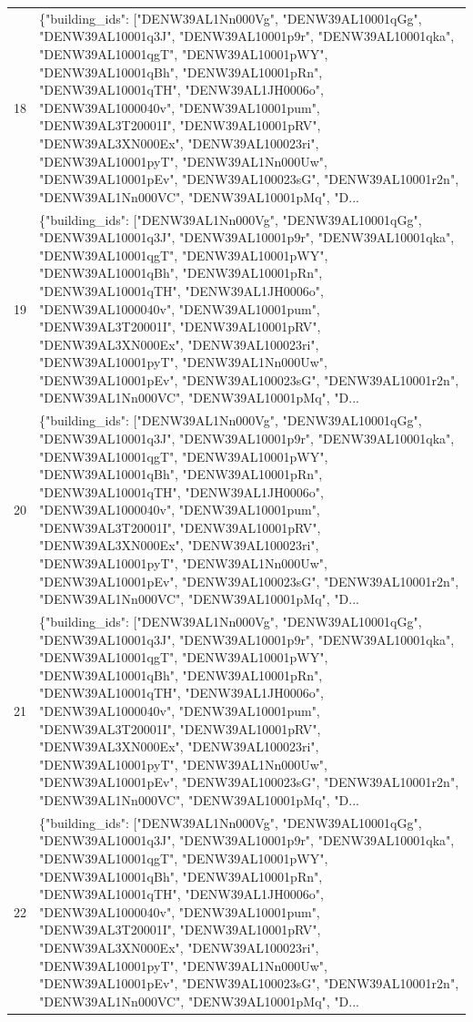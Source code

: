 \documentclass[a4paper,11pt]{article}
\begin{document}
\begin{table}[ht]
\begin{tabular}{r p{12cm}}
18 & \{"building\_ids": ["DENW39AL1Nn000Vg", "DENW39AL10001qGg", "DENW39AL10001q3J", "DENW39AL10001p9r", "DENW39AL10001qka", "DENW39AL10001qgT", "DENW39AL10001pWY", "DENW39AL10001qBh", "DENW39AL10001pRn", "DENW39AL10001qTH", "DENW39AL1JH0006o", "DENW39AL1000040v", "DENW39AL10001pum", "DENW39AL3T20001I", "DENW39AL10001pRV", "DENW39AL3XN000Ex", "DENW39AL100023ri", "DENW39AL10001pyT", "DENW39AL1Nn000Uw", "DENW39AL10001pEv", "DENW39AL100023sG", "DENW39AL10001r2n", "DENW39AL1Nn000VC", "DENW39AL10001pMq", "D... \\
19 & \{"building\_ids": ["DENW39AL1Nn000Vg", "DENW39AL10001qGg", "DENW39AL10001q3J", "DENW39AL10001p9r", "DENW39AL10001qka", "DENW39AL10001qgT", "DENW39AL10001pWY", "DENW39AL10001qBh", "DENW39AL10001pRn", "DENW39AL10001qTH", "DENW39AL1JH0006o", "DENW39AL1000040v", "DENW39AL10001pum", "DENW39AL3T20001I", "DENW39AL10001pRV", "DENW39AL3XN000Ex", "DENW39AL100023ri", "DENW39AL10001pyT", "DENW39AL1Nn000Uw", "DENW39AL10001pEv", "DENW39AL100023sG", "DENW39AL10001r2n", "DENW39AL1Nn000VC", "DENW39AL10001pMq", "D... \\
20 & \{"building\_ids": ["DENW39AL1Nn000Vg", "DENW39AL10001qGg", "DENW39AL10001q3J", "DENW39AL10001p9r", "DENW39AL10001qka", "DENW39AL10001qgT", "DENW39AL10001pWY", "DENW39AL10001qBh", "DENW39AL10001pRn", "DENW39AL10001qTH", "DENW39AL1JH0006o", "DENW39AL1000040v", "DENW39AL10001pum", "DENW39AL3T20001I", "DENW39AL10001pRV", "DENW39AL3XN000Ex", "DENW39AL100023ri", "DENW39AL10001pyT", "DENW39AL1Nn000Uw", "DENW39AL10001pEv", "DENW39AL100023sG", "DENW39AL10001r2n", "DENW39AL1Nn000VC", "DENW39AL10001pMq", "D... \\
21 & \{"building\_ids": ["DENW39AL1Nn000Vg", "DENW39AL10001qGg", "DENW39AL10001q3J", "DENW39AL10001p9r", "DENW39AL10001qka", "DENW39AL10001qgT", "DENW39AL10001pWY", "DENW39AL10001qBh", "DENW39AL10001pRn", "DENW39AL10001qTH", "DENW39AL1JH0006o", "DENW39AL1000040v", "DENW39AL10001pum", "DENW39AL3T20001I", "DENW39AL10001pRV", "DENW39AL3XN000Ex", "DENW39AL100023ri", "DENW39AL10001pyT", "DENW39AL1Nn000Uw", "DENW39AL10001pEv", "DENW39AL100023sG", "DENW39AL10001r2n", "DENW39AL1Nn000VC", "DENW39AL10001pMq", "D... \\
22 & \{"building\_ids": ["DENW39AL1Nn000Vg", "DENW39AL10001qGg", "DENW39AL10001q3J", "DENW39AL10001p9r", "DENW39AL10001qka", "DENW39AL10001qgT", "DENW39AL10001pWY", "DENW39AL10001qBh", "DENW39AL10001pRn", "DENW39AL10001qTH", "DENW39AL1JH0006o", "DENW39AL1000040v", "DENW39AL10001pum", "DENW39AL3T20001I", "DENW39AL10001pRV", "DENW39AL3XN000Ex", "DENW39AL100023ri", "DENW39AL10001pyT", "DENW39AL1Nn000Uw", "DENW39AL10001pEv", "DENW39AL100023sG", "DENW39AL10001r2n", "DENW39AL1Nn000VC", "DENW39AL10001pMq", "D... \\

\end{tabular}
\end{table}
\end{document}
